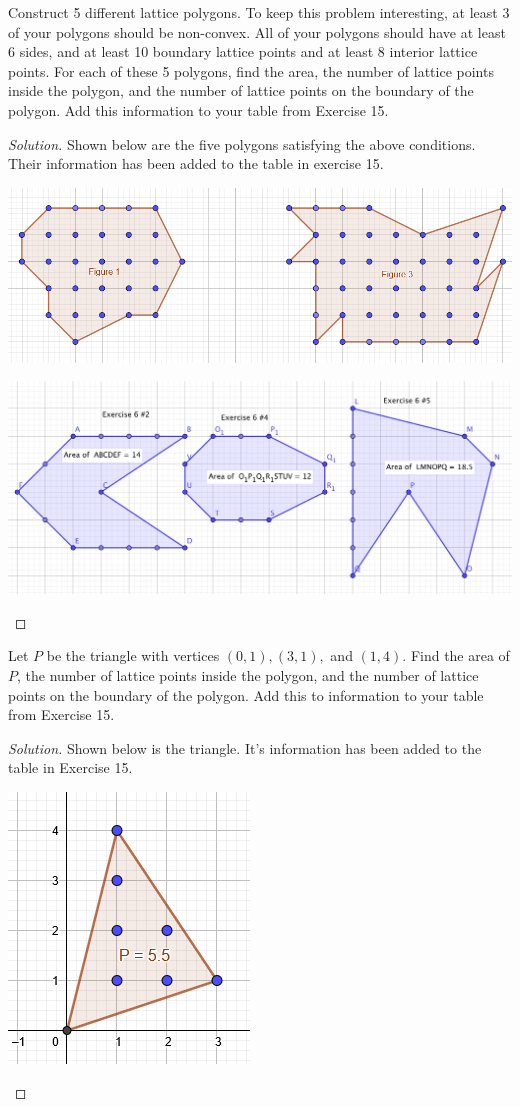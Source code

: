 \documentclass[12pt]{article}
\newenvironment{exercise}[2][Exercise]{\begin{trivlist}
        \item[\hskip \labelsep {\bfseries #1}\hskip \labelsep {\bfseries #2.}]}{\end{trivlist}}
\newenvironment{solution}
        {\begin{proof}[Solution]}
                    {\end{proof}}
\begin{document}
\begin{exercise}{16}
    Construct 5 different lattice polygons. To keep this problem interesting, at least 3 of your polygons should be non-convex. All of your polygons should have at least 6 sides, and at least 10 boundary lattice points and at least 8 interior lattice points. For each of these 5 polygons, find the area, the number of lattice points inside the polygon, and the number of lattice points on the boundary of the polygon. Add this information to your table from Exercise 15.
    \begin{solution}
        Shown below are the five polygons satisfying the above conditions. Their information has been added to the table in exercise 15.
        \begin{center}
            \includegraphics[width=.7\linewidth]{16-1}
        \end{center}
        \begin{center}
            \includegraphics[width=.6\linewidth]{16-2}
        \end{center}
    \end{solution}
\end{exercise}

\begin{exercise}{17}
    Let \( P \) be the triangle with vertices \( ( 0,1 ) , ( 3,1 ) , \) and \( ( 1,4 ) . \) Find the area of \( P \), the number of lattice points inside the polygon, and the number of lattice points on the boundary of the polygon. Add this to information to your table from Exercise 15.
    \begin{solution}
        Shown below is the triangle. It's information has been added to the table in Exercise 15.
        \begin{center}
            \includegraphics[width=.3\linewidth]{17}
        \end{center}
    \end{solution}
\end{exercise}
\end{document}
